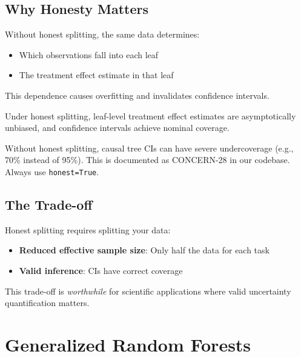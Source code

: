 \subsection{Why Honesty Matters}

Without honest splitting, the same data determines:
\begin{itemize}
    \item Which observations fall into each leaf
    \item The treatment effect estimate in that leaf
\end{itemize}

This dependence causes overfitting and invalidates confidence intervals.

\begin{theorem}
Under honest splitting, leaf-level treatment effect estimates are asymptotically unbiased, and confidence intervals achieve nominal coverage.
\end{theorem}

\begin{insight}
Without honest splitting, causal tree CIs can have severe undercoverage (e.g., 70\% instead of 95\%). This is documented as CONCERN-28 in our codebase. Always use \texttt{honest=True}.
\end{insight}

\subsection{The Trade-off}

Honest splitting requires splitting your data:
\begin{itemize}
    \item \textbf{Reduced effective sample size}: Only half the data for each task
    \item \textbf{Valid inference}: CIs have correct coverage
\end{itemize}

This trade-off is \emph{worthwhile} for scientific applications where valid uncertainty quantification matters.

\section{Generalized Random Forests}
\label{sec:grf}

